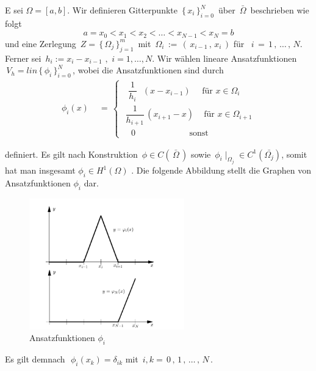 \newpage
\begin{Beispiel} 
E sei $\Omega = [a,b]$. Wir definieren Gitterpunkte $\, \{ \, x_i \, \}_{i=0}^{N} \, $ über $\, \bar\Omega \, $  beschrieben wie folgt
\begin{equation*}
a = x_0 < x_1 < x_2 < \dots < x_{N-1} < x_N = b
\end{equation*}
und eine Zerlegung  $\, Z= \, \{ \, \Omega_j  \, \}_{j=1}^{m} \, $ mit $ \, \Omega_i \, := \,  ( \, x_{i-1} \, , \, x_i \,)$ für $\, \, \, i \, = \,1 \, , \, \dots \, , \, N$. 
Ferner sei $\, h_i := x_i - x_{i-1} \, \, , \, \,  i=1,\dots,N$. Wir wählen lineare Ansatzfunktionen $ \, V_h=lin \, \{ \, \phi_i \, \}_{i=0}^{N} \,$, wobei die Ansatzfunktionen sind durch
\begin{equation*}
\begin{aligned}
\phi_i(x) \, \, &= \, 
\begin{cases}
\, \, \, \, \dfrac{1}{h_i} \, \, \, \, (x-x_{i-1})   \, \, \, \, \, \,  \text{ für } x \in \Omega_i \\
\, \, \dfrac{1}{h_{i+1}} \, (x_{i+1}-x) \, \, \, \, \, \text{ für } x \in \Omega_{i+1}  \\
\, \, \, \, \, \,  0 \, \, \, \, \, \, \, \, \,  \, \, \, \, \, \, \, \, \, \, \, \, \, \, \, \, \, \, \, \, \, \, \, \, \, \, \, \text{ sonst }
\end{cases}
\end{aligned}
\end{equation*}

definiert. Es gilt nach Konstruktion $\, \phi \in C(\, \bar{\Omega} \, )$ sowie $\, \phi_{i}\mid_{\Omega_{j}} \in C^{1}(\bar{\Omega_{j}})$, somit hat man insgesamt $\phi_i \in H^{1}(\Omega)$ \cite[184]{Numerik}.
Die folgende Abbildung stellt die Graphen von Ansatzfunktionen $\phi_i$ dar.

\begin{figure}[ht]
	\centering
  \includegraphics[width=0.6\textwidth]{hatfunction.png}
	\caption{Ansatzfunktionen $\phi_i$ \cite[184]{Numerik}}
	\label{fig:hat}
\end{figure}

Es gilt demnach $\, \, \phi_i (x_k) = \delta_{ik}$ mit  $\, i  ,  k = \, 0 \, , \, 1 \, , \, \dots \,, \,N \,$.
\end{Beispiel}

